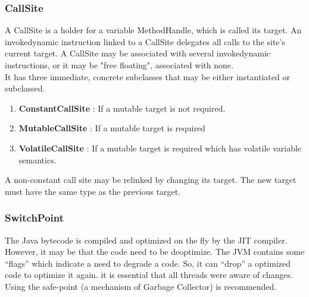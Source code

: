 \documentclass{sigplanconf}
\def \JVM{\ac{JVM}\xspace}
\begin{document}
      \subsubsection{CallSite}
        A CallSite is a holder for a variable MethodHandle, which is called its target.
        An invokedynamic instruction linked to a CallSite delegates all calls to the site's current target.
        A CallSite may be associated with several invokedynamic instructions,
        or it may be "free floating", associated with none.\\

        It has three immediate, concrete subclasses that may be either instantiated or subclassed.
        \begin{enumerate}
          \item \textbf{ConstantCallSite} : If a mutable target is not required.
          \item \textbf{MutableCallSite}  : If a mutable target is required
          \item \textbf{VolatileCallSite} : If a mutable target is required which has volatile variable semantics.
        \end{enumerate}
        A non-constant call site may be relinked by changing its target.
        The new target must have the same type as the previous target.

      \subsubsection{SwitchPoint}
        The Java bytecode is compiled and optimized on the fly by the JIT compiler.
        However, it may be that the code need to be deoptimize.
        The \JVM contains some ``flags'' which indicate a need to degrade a code.
        So, it can ``drop'' a optimized code to optimize it again.
        it is essential that all threads were aware of changes.
        Using the safe-point (a mechanism of Garbage Collector) is recommended.
\end{document}
